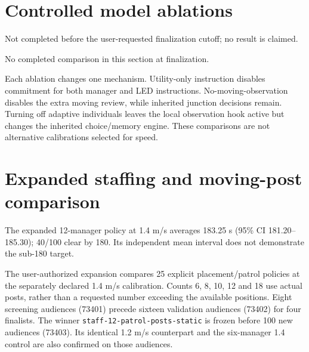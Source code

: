 \documentclass[11pt,a4paper]{article}
\newcommand{\code}[1]{{\small\nolinkurl{#1}}}
\begin{document}
\section{Controlled model ablations}

Not completed before the user-requested finalization cutoff; no result is claimed.


No completed comparison in this section at finalization.


Each ablation changes one mechanism. Utility-only instruction disables commitment for both manager and LED instructions. No-moving-observation disables the extra moving review, while inherited junction decisions remain. Turning off adaptive individuals leaves the local observation hook active but changes the inherited choice/memory engine. These comparisons are not alternative calibrations selected for speed.


\section{Expanded staffing and moving-post comparison}

The expanded 12-manager policy at 1.4 m/s averages 183.25 s (95\% CI 181.20–185.30); 40/100 clear by 180. Its independent mean interval does not demonstrate the sub-180 target.


The user-authorized expansion compares 25 explicit placement/patrol policies at the separately declared 1.4 m/s calibration. Counts 6, 8, 10, 12 and 18 use actual posts, rather than a requested number exceeding the available positions. Eight screening audiences (73401) precede sixteen validation audiences (73402) for four finalists. The winner \code{staff-12-patrol-posts-static} is frozen before 100 new audiences (73403). Its identical 1.2 m/s counterpart and the six-manager 1.4 control are also confirmed on those audiences.
\end{document}
